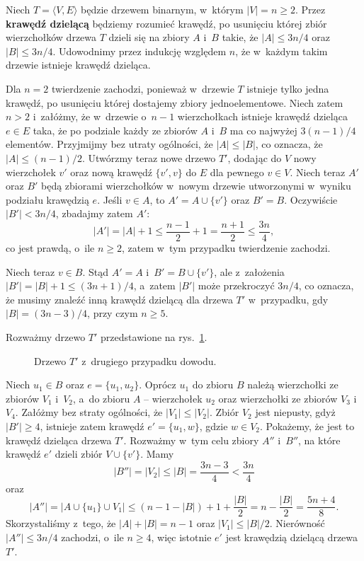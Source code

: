 
\subproblem %
Niech $T=\langle V,E\rangle$ będzie drzewem binarnym, w~którym $|V|=n\ge2$.
Przez \textbf{krawędź dzielącą} będziemy rozumieć krawędź, po usunięciu której zbiór wierzchołków drzewa $T$ dzieli się na zbiory $A$ i~$B$ takie, że $|A|\le3n/4$ oraz $|B|\le3n/4$.
Udowodnimy przez indukcję względem $n$, że w~każdym takim drzewie istnieje krawędź dzieląca.

Dla $n=2$ twierdzenie zachodzi, ponieważ w~drzewie $T$ istnieje tylko jedna krawędź, po usunięciu której dostajemy zbiory jednoelementowe.
Niech zatem $n>2$ i~załóżmy, że w~drzewie o~$n-1$ wierzchołkach istnieje krawędź dzieląca $e\in E$ taka, że po podziale każdy ze zbiorów $A$ i~$B$ ma co najwyżej $3(n-1)/4$ elementów.
Przyjmijmy bez utraty ogólności, że $|A|\le|B|$, co oznacza, że $|A|\le(n-1)/2$.
Utwórzmy teraz nowe drzewo $T'$, dodając do $V$ nowy wierzchołek $v'$ oraz nową krawędź $\{v',v\}$ do $E$ dla pewnego $v\in V$.
Niech teraz $A'$ oraz $B'$ będą zbiorami wierzchołków w~nowym drzewie utworzonymi w~wyniku podziału krawędzią $e$.
Jeśli $v\in A$, to $A'=A\cup\{v'\}$ oraz $B'=B$.
Oczywiście $|B'|<3n/4$, zbadajmy zatem $A'$:
\[
	|A'| = |A|+1 \le \frac{n-1}{2}+1 = \frac{n+1}{2} \le \frac{3n}{4},
\]
co jest prawdą, o~ile $n\ge2$, zatem w~tym przypadku twierdzenie zachodzi.

Niech teraz $v\in B$.
Stąd $A'=A$ i~$B'=B\cup \{v'\}$, ale z~założenia $|B'|=|B|+1\le(3n+1)/4$, a~zatem $|B'|$ może przekroczyć $3n/4$, co oznacza, że musimy znaleźć inną krawędź dzielącą dla drzewa $T'$ w~przypadku, gdy $|B|=(3n-3)/4$, przy czym $n\ge5$.

Rozważmy drzewo $T'$ przedstawione na rys.\ \ref{fig:B-3a}.
\begin{figure}[!ht]
	\centering 
	\caption{Drzewo $T'$ z~drugiego przypadku dowodu.} \label{fig:B-3a}
\end{figure}
Niech $u_1\in B$ oraz $e=\{u_1,u_2\}$.
Oprócz $u_1$ do zbioru $B$ należą wierzchołki ze zbiorów $V_1$ i~$V_2$, a~do zbioru $A$ -- wierzchołek $u_2$ oraz wierzchołki ze zbiorów $V_3$ i~$V_4$.
Załóżmy bez straty ogólności, że $|V_1|\le|V_2|$.
Zbiór $V_2$ jest niepusty, gdyż $|B'|\ge4$, istnieje zatem krawędź $e'=\{u_1,w\}$, gdzie $w\in V_2$.
Pokażemy, że jest to krawędź dzieląca drzewa $T'$.
Rozważmy w~tym celu zbiory $A''$ i~$B''$, na które krawędź $e'$ dzieli zbiór $V\cup\{v'\}$.
Mamy
\[
	|B''| = |V_2| \le |B| = \frac{3n-3}{4} < \frac{3n}{4}
\]
oraz
\[
	|A''| = \bigl|A\cup\{u_1\}\cup V_1\bigr| \le (n-1-|B|)+1+\frac{|B|}{2} = n-\frac{|B|}{2} = \frac{5n+4}{8}.
\]
Skorzystaliśmy z~tego, że $|A|+|B|=n-1$ oraz $|V_1|\le|B|/2$.
Nierówność $|A''|\le3n/4$ zachodzi, o~ile $n\ge4$, więc istotnie $e'$ jest krawędzią dzielącą drzewa $T'$.

